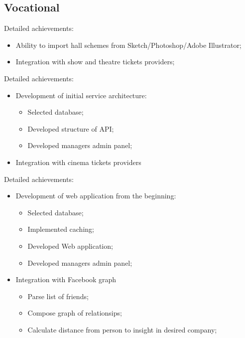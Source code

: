 \documentclass[11pt,a4paper,sans]{moderncv}        %
\begin{document}
\subsection{Vocational}
%
%
Detailed achievements:%
\begin{itemize}%
\item Ability to import hall schemes from Sketch/Photoshop/Adobe Illustrator;%
\item Integration with show and theatre tickets providers;%
\end{itemize}%
%
Detailed achievements:%
\begin{itemize}%
\item Development of initial service architecture:%
 \begin{itemize}%
  \item Selected database;%
  \item Developed structure of API;%
  \item Developed managers admin panel;%
  \end{itemize}%
\item Integration with cinema tickets providers%
\end{itemize}
Detailed achievements:%
\begin{itemize}%
\item Development of web application from the beginning:%
 \begin{itemize}%
  \item Selected database;%
  \item Implemented caching;%
  \item Developed Web application;%
  \item Developed managers admin panel;%
  \end{itemize}%
\item Integration with Facebook graph%
 \begin{itemize}%
  \item Parse list of friends;%
  \item Compose graph of relationsips;%
  \item Calculate distance from person to insight in desired company;%
 \end{itemize}
\end{itemize}
\end{document}
